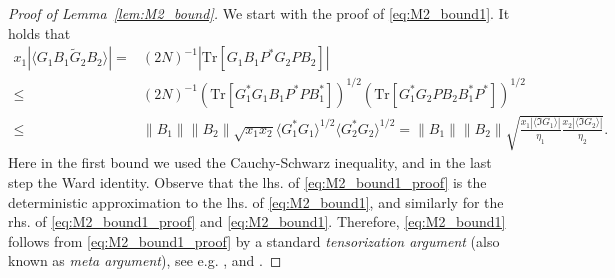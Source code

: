 \documentclass[10pt]{amsart}
\numberwithin{equation}{section}
\begin{document}
\begin{proof}[Proof of Lemma~\ref{lem:M2_bound}] We start with the proof of \eqref{eq:M2_bound1}. It holds that
\begin{equation}
\begin{split}
x_1\left\vert \langle G_1B_1\widetilde{G}_2B_2\rangle\right\vert =& (2N)^{-1} \left\vert \mathrm{Tr}\left[ G_1B_1P^*G_2PB_2\right]\right\vert\\ 
\le &(2N)^{-1}\left(\mathrm{Tr}\left[ G_1^*G_1B_1P^*PB_1^*\right]\right)^{1/2}\left( \mathrm{Tr}\left[ G_1^*G_2 PB_2B_1^*P^*\right]\right)^{1/2}\\
\le &\|B_1\|\|B_2\|\sqrt{x_1x_2}\langle G_1^*G_1\rangle^{1/2}\langle G_2^*G_2\rangle^{1/2} = \|B_1\|\|B_2\|\sqrt{\frac{x_1|\langle \Im G_1\rangle|}{\eta_1}\frac{x_2|\langle \Im G_2\rangle|}{\eta_2}}.
\end{split}
\label{eq:M2_bound1_proof}
\end{equation}
Here in the first bound we used the Cauchy-Schwarz inequality, and in the last step the Ward identity. Observe that the lhs. of \eqref{eq:M2_bound1_proof} is the deterministic approximation to the lhs. of \eqref{eq:M2_bound1}, and similarly for the rhs. of \eqref{eq:M2_bound1_proof} and \eqref{eq:M2_bound1}. Therefore, \eqref{eq:M2_bound1} follows from \eqref{eq:M2_bound1_proof} by a standard \emph{tensorization argument} (also known as \emph{meta argument}), see e.g. \cite[Section~2.6]{Najim16}, \cite[Proof of Lemma~D.1]{non-herm_overlaps} and \cite[Proof of Lemma~S2.6]{hyperuniformity}. 


\end{proof}
\end{document}
